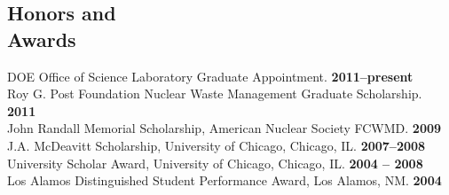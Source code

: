 \documentclass[margin,line]{resume}
\begin{document}
\begin{resume}
    \section{\mysidestyle Honors and\\Awards} 
		DOE Office of Science Laboratory Graduate Appointment.                 \hfill \textbf{2011--present}\vspace{.5mm}\\%
		Roy G. Post Foundation Nuclear Waste Management Graduate Scholarship.       \hfill \textbf{2011}\vspace{.5mm}\\%
		John Randall Memorial Scholarship, American Nuclear Society FCWMD.          \hfill \textbf{2009}\vspace{.5mm}\\%
		J.A. McDeavitt Scholarship, University of Chicago, Chicago, IL.        \hfill\textbf{2007--2008}\vspace{.5mm}\\%
		University Scholar Award, University of Chicago, Chicago, IL.        \hfill\textbf{2004 -- 2008}\vspace{.5mm}\\%
		Los Alamos Distinguished Student Performance Award, Los Alamos, NM.          \hfill\textbf{2004}\vspace{.5mm}\\%


\end{resume}
\end{document}
